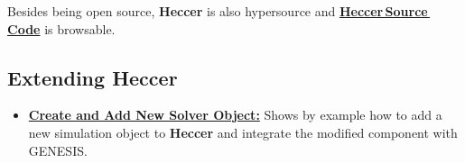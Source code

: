 \documentclass[12pt]{article}
\begin{document}
Besides being open source, {\bf Heccer} is also hypersource and \href{http://repo-genesis3.cbi.utsa.edu/crossref/heccer/heccer/index.html}{\bf Heccer\,Source\,Code} is browsable.

\subsection*{Extending Heccer}
\begin{itemize}
   \item \href{../genesis-add-object-solver/genesis-add-object-solver.tex}{\bf Create and Add New Solver Object:} Shows by example how to add a new simulation object to {\bf Heccer} and integrate the modified component with GENESIS.
\end{itemize}
\end{document}
